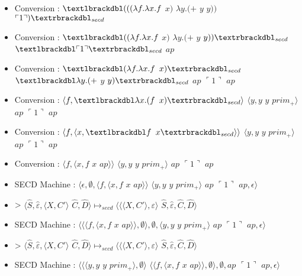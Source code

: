 \documentclass[10pt,a4paper]{article}
\begin{document}
					\begin{itemize}
						\item[] Conversion : $\textlbrackdbl(((\lambda f.\lambda x.f$ $x)$ $\lambda y.(+$ $y$ $y))$ $\ulcorner 1\urcorner)\textrbrackdbl_{secd}$
						\item[] Conversion : $\textlbrackdbl((\lambda f.\lambda x.f$ $x)$ $\lambda y.(+$ $y$ $y))\textrbrackdbl_{secd}$ $\textlbrackdbl\ulcorner 1\urcorner\textrbrackdbl_{secd}$ $ap$
						\item[] Conversion : $\textlbrackdbl(\lambda f.\lambda x.f$ $x)\textrbrackdbl_{secd}$ $\textlbrackdbl\lambda y.(+$ $y$ $y)\textrbrackdbl_{secd}$ $ap$ $\ulcorner 1\urcorner$ $ap$
						\item[] Conversion : $\langle f,\textlbrackdbl\lambda x.(f$ $x)\textrbrackdbl_{secd}\rangle$ $\langle y,y$ $y$ $prim_{+}\rangle$ $ap$ $\ulcorner 1\urcorner$ $ap$
						\item[] Conversion : $\langle f,\langle x,\textlbrackdbl f$ $x\textrbrackdbl_{secd}\rangle\rangle$ $\langle y,y$ $y$ $prim_{+}\rangle$ $ap$ $\ulcorner 1\urcorner$ $ap$
						\item[] Conversion : $\langle f,\langle x,f$ $x$ $ap\rangle\rangle$ $\langle y,y$ $y$ $prim_{+}\rangle$ $ap$ $\ulcorner 1\urcorner$ $ap$
						\item[] SECD Machine : $\langle\epsilon,\emptyset,\langle f,\langle x,f$ $x$ $ap\rangle\rangle$ $\langle y,y$ $y$ $prim_{+}\rangle$ $ap$ $\ulcorner 1\urcorner$ $ap,\epsilon\rangle$ 
						\item[] > $\langle\widehat{S},\widehat{\varepsilon},\langle X,C'\rangle$ $\widehat{C},\widehat{D}\rangle \longmapsto_{secd} \langle\langle\langle X,C'\rangle,\varepsilon\rangle$ $\widehat{S},\widehat{\varepsilon},\widehat{C},\widehat{D}\rangle$
						\item[] SECD Machine : $\langle\langle\langle f,\langle x,f$ $x$ $ap\rangle\rangle,\emptyset\rangle,\emptyset,\langle y,y$ $y$ $prim_{+}\rangle$ $ap$ $\ulcorner 1\urcorner$ $ap,\epsilon\rangle$ 
						\item[] > $\langle\widehat{S},\widehat{\varepsilon},\langle X,C'\rangle$ $\widehat{C},\widehat{D}\rangle \longmapsto_{secd} \langle\langle\langle X,C'\rangle,\varepsilon\rangle$ $\widehat{S},\widehat{\varepsilon},\widehat{C},\widehat{D}\rangle$
						\item[] SECD Machine : $\langle\langle\langle y,y$ $y$ $prim_{+}\rangle,\emptyset\rangle$ $\langle\langle f,\langle x,f$ $x$ $ap\rangle\rangle,\emptyset\rangle,\emptyset,ap$ $\ulcorner 1\urcorner$ $ap,\epsilon\rangle$

\end{itemize}
\end{document}
